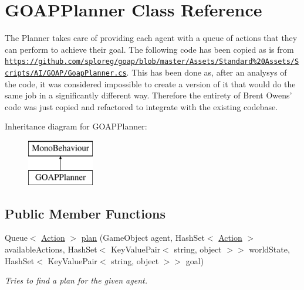 \hypertarget{class_g_o_a_p_planner}{}\section{G\+O\+A\+P\+Planner Class Reference}
\label{class_g_o_a_p_planner}


The Planner takes care of providing each agent with a queue of actions that they can perform to achieve their goal. The following code has been copied as is from \href{https://github.com/sploreg/goap/blob/master/Assets/Standard%20Assets/Scripts/AI/GOAP/GoapPlanner.cs}{\tt https\+://github.\+com/sploreg/goap/blob/master/\+Assets/\+Standard\%20\+Assets/\+Scripts/\+A\+I/\+G\+O\+A\+P/\+Goap\+Planner.\+cs}. This has been done as, after an analysys of the code, it was considered impossible to create a version of it that would do the same job in a significantly different way. Therefore the entirety of Brent Owens' code was just copied and refactored to integrate with the existing codebase.  


Inheritance diagram for G\+O\+A\+P\+Planner\+:\begin{figure}[H]
\begin{center}
\leavevmode
\includegraphics[height=2.000000cm]{class_g_o_a_p_planner}
\end{center}
\end{figure}
\subsection*{Public Member Functions}
\begin{DoxyCompactItemize}
\item 
Queue$<$ \hyperlink{class_action}{Action} $>$ \hyperlink{class_g_o_a_p_planner_a1d2b4333230b1d4ed3a37fedf3fae911}{plan} (Game\+Object agent, Hash\+Set$<$ \hyperlink{class_action}{Action} $>$ available\+Actions, Hash\+Set$<$ Key\+Value\+Pair$<$ string, object $>$$>$ world\+State, Hash\+Set$<$ Key\+Value\+Pair$<$ string, object $>$$>$ goal)
\begin{DoxyCompactList}\small\item\em Tries to find a plan for the given agent. \end{DoxyCompactList}\end{DoxyCompactItemize}



